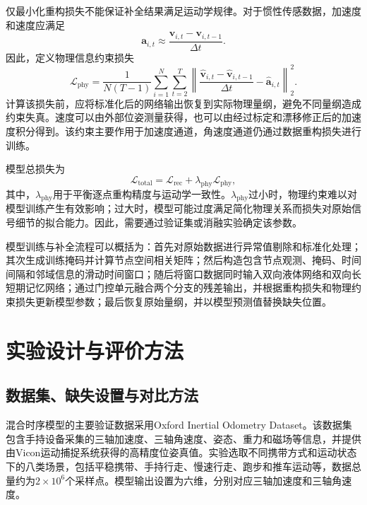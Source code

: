 仅最小化重构损失不能保证补全结果满足运动学规律。对于惯性传感数据，加速度和速度应满足
\begin{equation}
    \boldsymbol{a}_{i,t}
    \approx
    \frac{
    \boldsymbol{v}_{i,t}
    -
    \boldsymbol{v}_{i,t-1}
    }{\Delta t}.
\end{equation}
因此，定义物理信息约束损失
\begin{equation}
    \mathcal{L}_{\mathrm{phy}}
    =
    \frac{1}{N(T-1)}
    \sum_{i=1}^{N}
    \sum_{t=2}^{T}
    \left\|
    \frac{
    \widehat{\boldsymbol{v}}_{i,t}
    -
    \widehat{\boldsymbol{v}}_{i,t-1}
    }{\Delta t}
    -
    \widehat{\boldsymbol{a}}_{i,t}
    \right\|_2^2.
\end{equation}
计算该损失前，应将标准化后的网络输出恢复到实际物理量纲，避免不同量纲造成约束失真。速度可以由外部位姿测量获得，也可以由经过标定和漂移修正后的加速度积分得到。该约束主要作用于加速度通道，角速度通道仍通过数据重构损失进行训练。

模型总损失为
\begin{equation}
    \mathcal{L}_{\mathrm{total}}
    =
    \mathcal{L}_{\mathrm{rec}}
    +
    \lambda_{\mathrm{phy}}
    \mathcal{L}_{\mathrm{phy}},
\end{equation}
其中，$\lambda_{\mathrm{phy}}$用于平衡逐点重构精度与运动学一致性。$\lambda_{\mathrm{phy}}$过小时，物理约束难以对模型训练产生有效影响；过大时，模型可能过度满足简化物理关系而损失对原始信号细节的拟合能力。因此，需要通过验证集或消融实验确定该参数。

模型训练与补全流程可以概括为：首先对原始数据进行异常值剔除和标准化处理；其次生成训练掩码并计算节点空间相关矩阵；然后构造包含节点观测、掩码、时间间隔和邻域信息的滑动时间窗口；随后将窗口数据同时输入双向液体网络和双向长短期记忆网络；通过门控单元融合两个分支的残差输出，并根据重构损失和物理约束损失更新模型参数；最后恢复原始量纲，并以模型预测值替换缺失位置。

\section{实验设计与评价方法}

\subsection{数据集、缺失设置与对比方法}

混合时序模型的主要验证数据采用Oxford Inertial Odometry Dataset。该数据集包含手持设备采集的三轴加速度、三轴角速度、姿态、重力和磁场等信息，并提供由Vicon运动捕捉系统获得的高精度位姿真值。实验选取不同携带方式和运动状态下的八类场景，包括平稳携带、手持行走、慢速行走、跑步和推车运动等，数据总量约为$2\times10^6$个采样点。模型输出设置为六维，分别对应三轴加速度和三轴角速度。


